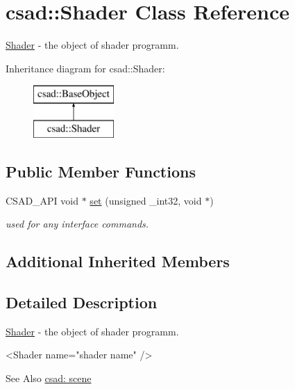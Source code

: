 \hypertarget{classcsad_1_1_shader}{\section{csad\-:\-:Shader Class Reference}
\label{classcsad_1_1_shader}
}


\hyperlink{classcsad_1_1_shader}{Shader} -\/ the object of shader programm.  


Inheritance diagram for csad\-:\-:Shader\-:\begin{figure}[H]
\begin{center}
\leavevmode
\includegraphics[height=2.000000cm]{classcsad_1_1_shader}
\end{center}
\end{figure}
\subsection*{Public Member Functions}
\begin{DoxyCompactItemize}
\item 
\hypertarget{classcsad_1_1_shader_a5f7e6e5396ee4b432ae118b65ce58446}{C\-S\-A\-D\-\_\-\-A\-P\-I void $\ast$ \hyperlink{classcsad_1_1_shader_a5f7e6e5396ee4b432ae118b65ce58446}{set} (unsigned \-\_\-int32, void $\ast$)}\label{classcsad_1_1_shader_a5f7e6e5396ee4b432ae118b65ce58446}

\begin{DoxyCompactList}\small\item\em used for any interface commands. \end{DoxyCompactList}\end{DoxyCompactItemize}
\subsection*{Additional Inherited Members}


\subsection{Detailed Description}
\hyperlink{classcsad_1_1_shader}{Shader} -\/ the object of shader programm. 

\begin{DoxyVerb}  <Shader name="shader name" />
\end{DoxyVerb}
 \begin{DoxySeeAlso}{See Also}
\hyperlink{group__scene}{csad\-: scene} 
\end{DoxySeeAlso}
